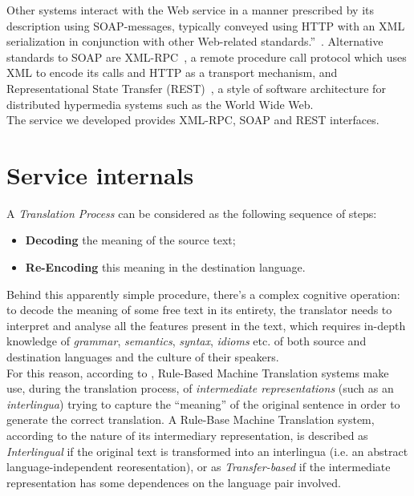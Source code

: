 \documentclass[11pt]{article}
\begin{document}
Other systems interact with the Web service in a manner prescribed by its description using SOAP-messages, typically conveyed using HTTP with an XML serialization in conjunction with other Web-related standards.''~\citep{wsgloss}. Alternative standards to SOAP are XML-RPC~\citep{xmlrpcspec}, a remote procedure call protocol which uses XML to encode its calls and HTTP as a transport mechanism, and Representational State Transfer (REST)~\citep{rest}, a style of software architecture for distributed hypermedia systems such as the World Wide Web.\\

The service we developed provides XML-RPC, SOAP and REST interfaces.


\section{Service internals}

A \emph{Translation Process} can be considered as the following sequence of steps:

\begin{itemize}
 \item {\bf Decoding} the meaning of the source text;
 \item {\bf Re-Encoding} this meaning in the destination language.
\end{itemize}

Behind this apparently simple procedure, there's a complex cognitive operation: to decode the meaning of some free text in its entirety, the translator needs to interpret and analyse all the features present in the text, which requires in-depth knowledge of \emph{grammar}, \emph{semantics}, \emph{syntax}, \emph{idioms} etc. of both source and destination languages and the culture of their speakers.\\

For this reason, according to \cite{arnoldea}, Rule-Based Machine Translation systems make use, during the translation process, of \emph{intermediate representations} (such as an \emph{interlingua}) trying to capture the ``meaning'' of the original sentence in order to generate the  correct translation. A Rule-Base Machine Translation system, according to the nature of its intermediary representation, is described as \emph{Interlingual} if the original text is transformed into an interlingua (i.e. an abstract language-independent reoresentation), or as \emph{Transfer-based} if the intermediate representation has some dependences on the language pair involved.\\
\end{document}
